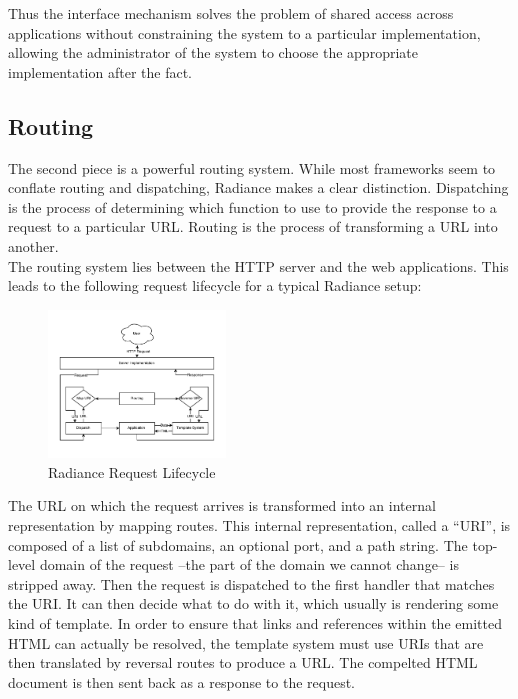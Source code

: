 \documentclass{sig-alternate-05-2015}
\begin{document}
Thus the interface mechanism solves the problem of shared access across applications without constraining the system to a particular implementation, allowing the administrator of the system to choose the appropriate implementation after the fact. \\

\subsection{Routing}
The second piece is a powerful routing system. While most frameworks seem to conflate routing and dispatching, Radiance makes a clear distinction. Dispatching is the process of determining which function to use to provide the response to a request to a particular URL. Routing is the process of transforming a URL into another. \\

The routing system lies between the HTTP server and the web applications. This leads to the following request lifecycle for a typical Radiance setup: \\

\begin{figure}[H]
  \centering
  \includegraphics[width=0.42\textwidth]{request.pdf}
  \caption{Radiance Request Lifecycle}
\end{figure}

The URL on which the request arrives is transformed into an internal representation by mapping routes. This internal representation, called a ``URI'', is composed of a list of subdomains, an optional port, and a path string. The top-level domain of the request --the part of the domain we cannot change-- is stripped away. Then the request is dispatched to the first handler that matches the URI. It can then decide what to do with it, which usually is rendering some kind of template. In order to ensure that links and references within the emitted HTML can actually be resolved, the template system must use URIs that are then translated by reversal routes to produce a URL. The compelted HTML document is then sent back as a response to the request. \\
\end{document}
